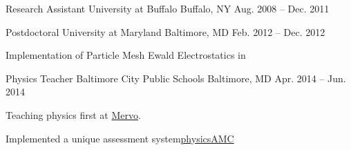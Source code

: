 

\begin{cventries}


  \cventry
    {Research Assistant} %
    {University at Buffalo} %
    {Buffalo, NY} %
    {Aug. 2008 -- Dec. 2011} %
    {
      \begin{cvitems} %
        \item {}
      \end{cvitems}
    }

  \cventry
    {Postdoctoral} %
    {University at Maryland} %
    {Baltimore, MD} %
    {Feb. 2012 -- Dec. 2012} %
    {
      \begin{cvitems} %
        \item {Implementation of Particle Mesh Ewald Electrostatics in}
      \end{cvitems}
    }

  \cventry
    {Physics Teacher} %
    {Baltimore City Public Schools} %
    {Baltimore, MD} %
    {Apr. 2014 -- Jun. 2014} %
    {
      \begin{cvitems} %
      \item {Teaching physics first at \href{www.mervo.org}{Mervo}.}
      \item {Implemented a unique assessment system\href{jphafner.github.com/physicsAMC}{physicsAMC}}
      \end{cvitems}
    }


\end{cventries}
